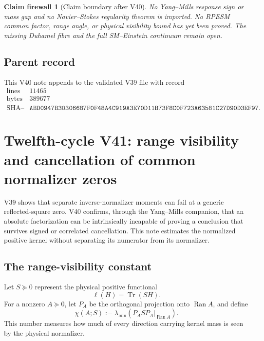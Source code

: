 \documentclass[11pt]{article}
\newtheorem{firewall}[theorem]{Claim firewall}
\theoremstyle{remark}
\begin{document}
\begin{firewall}[Claim boundary after V40]
\label{fire:v12v40-claim}
No Yang--Mills response sign or mass gap and no Navier--Stokes
regularity theorem is imported.  No RPESM common factor, range angle,
or physical visibility bound has yet been proved.  The missing
Duhamel fibre and the full SM--Einstein continuum remain open.
\end{firewall}

\subsection{Parent record}

This V40 note appends to the validated V39 file with record
\[
\begin{array}{c|c}
\text{lines}&11465\\
\text{bytes}&389677\\
\text{SHA--256}&
\texttt{ABD0947B30306687F0F48A4C919A3E70D11B73F8C0F723A63581C27D90D3EF97}.
\end{array}
\]


\section{Twelfth-cycle V41: range visibility and cancellation of
common normalizer zeros}
\label{sec:v12v41}

V39 shows that separate inverse-normalizer moments can fail at a
generic reflected-square zero.  V40 confirms, through the
Yang--Mills companion, that an absolute factorization can be
intrinsically incapable of proving a conclusion that survives signed
or correlated cancellation.  This note estimates the normalized
positive kernel without separating its numerator from its
normalizer.

\subsection{The range-visibility constant}

Let \(S\succeq0\) represent the physical positive functional
\[
 \ell(H)=\operatorname{Tr}(SH).
\]
For a nonzero \(A\succeq0\), let \(P_A\) be the orthogonal projection
onto \(\operatorname{Ran}A\), and define
\begin{equation}
 \chi(A;S):=
 \lambda_{\min}
 \left(P_ASP_A\big|_{\operatorname{Ran}A}\right).           \tag{41.1}
\end{equation}
This number measures how much of every direction carrying kernel
mass is seen by the physical normalizer.
\end{document}
